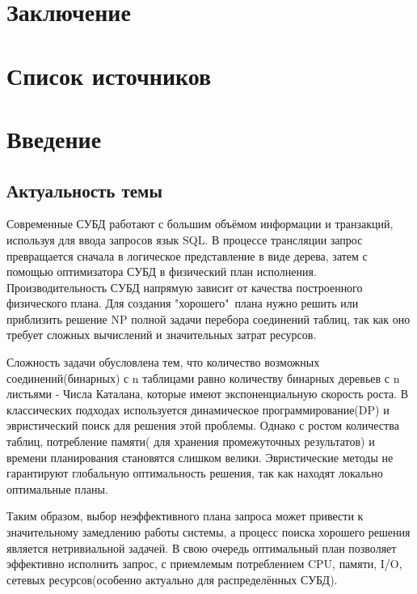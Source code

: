 \documentclass[12pt]{article}
\begin{document}
\begin{flushleft}
\section*{Заключение}

\section*{Список источников}
\newpage
\centering    \section*{Введение}
\centering    \subsection*{Актуальность темы}
\raggedright

Современные СУБД работают с большим объёмом информации и транзакций, используя для ввода запросов язык SQL. 
В процессе трансляции запрос превращается сначала в логическое представление в виде дерева, 
затем с помощью оптимизатора СУБД в физический план исполнения. Производительность СУБД напрямую зависит от качества
построенного физического плана. Для создания "хорошего"\ плана нужно решить или приблизить решение
NP полной задачи перебора соединений таблиц, так как оно требует сложных вычислений и значительных затрат ресурсов.

Сложность задачи обусловлена тем, что количество возможных соединений(бинарных) с n таблицами
равно количеству бинарных деревьев с n листьями - Числа Каталана, которые
имеют экспоненциальную скорость роста.
В классических подходах используется динамическое программирование(DP)
и эвристический поиск для решения этой проблемы. Однако с ростом количества таблиц,
потребление памяти( для хранения промежуточных результатов) и времени планирования становятся
слишком велики. Эвристические методы не гарантируют глобальную оптимальность решения, так как
находят локально оптимальные планы.

Таким образом, выбор неэффективного плана запроса может привести
к значительному замедлению работы системы, а процесс поиска хорошего решения является
нетривиальной задачей. В свою очередь оптимальный план позволяет эффективно исполнить
запрос, с приемлемым потреблением CPU, памяти, I/O, сетевых ресурсов(особенно актуально
для распределённых СУБД).



\end{flushleft}
\end{document}
